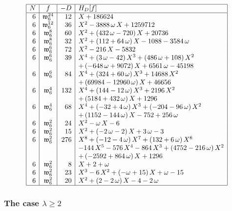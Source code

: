 \documentclass[12pt,twoside,leqno]{article}
\numberwithin{equation}{section}
\renewcommand{\geq}{\geqslant}
\newcommand{\w}{\mathfrak w}
\begin{document}
$$\begin{array}{|r|c|r|l|}\hline
N & f & -D & H_{D}[f] \\ \hline
6 & \w_{6}^{24} & 12 &
X+186624
\\
6 & \w_{6}^{12} & 36 &
{X}^{2}-3888\,\omega\,X+1259712
\\
6 & \w_{6}^{8} & 60 &
{X}^{2}+ \left( 432\,\omega-720 \right) X+20736
\\
6 & \w_{6}^{8} & 32 &
{X}^{2}+ \left( 112+64\,\omega \right) X-1088-3584\,\omega
\\
6 & \w_{6}^{6} & 72 &
{X}^{2}-216\,X-5832
\\
6 & \w_{6}^{6} & 39 &
{X}^{4}+ \left( 3\,\omega-42 \right) {X}^{3}+ \left( 486\,\omega+108
 \right) {X}^{2} \\
&&&+ \left( -648\,\omega+9072 \right) X+6561\,\omega- 45198
\\
6 & \w_{6}^{6} & 84 &
{X}^{4}+ \left( 324+60\,\omega \right) {X}^{3}+14688\,{X}^{2}\\
&&&+ \left( 69984-12960\,\omega \right) X+46656
\\
6 & \w_{6}^{4} & 132 &
{X}^{4}+ \left( 144-12\,\omega \right) {X}^{3}+2196\,{X}^{2}\\
&&&+ \left( 5184+432\,\omega \right) X+1296
\\
6 & \w_{6}^{4} & 68 &
{X}^{4}+ \left( -32+4\,\omega \right) {X}^{3}+ \left( -204-96\,\omega
 \right) {X}^{2}\\
&&&+ \left( 1152-144\,\omega \right) X-752+256\,\omega
\\
6 & \w_{6}^{2} & 24 &
{X}^{2}-\omega\,X-6
\\
6 & \w_{6}^{2} & 15 &
{X}^{2}+ \left( -2\,\omega-2 \right) X+3\,\omega-3
\\
6 & \w_{6}^{2} & 276 &
{X}^{8}+ \left( -12-4\,\omega \right) {X}^{7}+ \left( 132+6\,\omega
 \right) {X}^{6}\\
&&&-144\,{X}^{5}-576\,{X}^{4}-864\,{X}^{3}+ \left( 4752-
216\,\omega \right) {X}^{2}\\
&&&+ \left( -2592+864\,\omega \right) X+1296
\\
6 & \w_{6}^{2} & 8 &
X+2+\omega
\\
6 & \w_{6}^{2} & 23 &
{X}^{3}-6\,{X}^{2}+ \left( -\omega+15 \right) X+\omega-15
\\
6 & \w_{6}^{2} & 20 &
{X}^{2}+ \left( 2-2\,\omega \right) X-4-2\,\omega
\\
\hline
\end{array}$$

\subsubsection{The case \texorpdfstring {$\lambda \geq 2$}{lambda>=2}}
\end{document}
